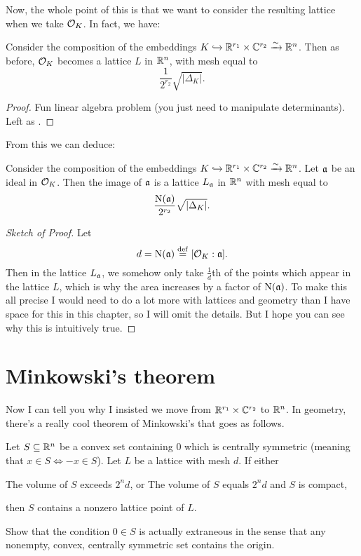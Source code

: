 Now, the whole point of this is that we want to consider the resulting lattice
when we take $\OO_K$. In fact, we have:
\begin{lemma}
	\label{lem:vol_OK_mesh}
	Consider the composition of the embeddings $K \injto \RR^{r_1} \times \CC^{r_2} \taking\sim \RR^n$.
	Then as before, $\OO_K$ becomes a lattice $L$ in $\RR^n$, with mesh equal to
	\[ \frac{1}{2^{r_2}} \sqrt{\left\lvert \Delta_K \right\rvert}. \]
\end{lemma}
\begin{proof}
	Fun linear algebra problem (you just need to manipulate determinants).
	Left as .
\end{proof}
From this we can deduce:
\begin{lemma}
	Consider the composition of the embeddings $K \injto \RR^{r_1} \times \CC^{r_2} \taking\sim \RR^n$.
	Let $\aa$ be an ideal in $\OO_K$.
	Then the image of $\aa$ is a lattice $L_\aa$ in $\RR^n$ with mesh equal to
	\[ \frac{\Norm(\aa)}{2^{r_2}} \sqrt{\left\lvert \Delta_K \right\rvert}. \]
\end{lemma}
\begin{proof}[Sketch of Proof]
	Let \[ d = \Norm(\aa) \defeq [\OO_K : \aa]. \]
	Then in the lattice $L_\aa$, we somehow only take $\frac 1d$th of the points
	which appear in the lattice $L$, which is why the area increases by a factor of $\Norm(\aa)$.
	To make this all precise I would need to do a lot more with lattices and geometry
	than I have space for this in this chapter, so I will omit the details.
	But I hope you can see why this is intuitively true.
\end{proof}

\section{Minkowski's theorem}
Now I can tell you why I insisted we move from $\RR^{r_1} \times \CC^{r_2}$ to $\RR^n$.
In geometry, there's a really cool theorem of Minkowski's that goes as follows.
\begin{theorem}
	[Minkowski]
	Let $S \subseteq \RR^n$ be a convex set containing $0$
	which is centrally symmetric (meaning that $x \in S \iff -x \in S$).
	Let $L$ be a lattice with mesh $d$.
	If either
	\begin{enumerate}[(a)]
		\ii The volume of $S$ exceeds $2^n d$, or
		\ii The volume of $S$ equals $2^n d$ and $S$ is compact,
	\end{enumerate}
	then $S$ contains a nonzero lattice point of $L$.
\end{theorem}
\begin{ques}
	Show that the condition $0 \in S$ is actually extraneous
	in the sense that any nonempty, convex, centrally symmetric set contains the origin.
\end{ques}

